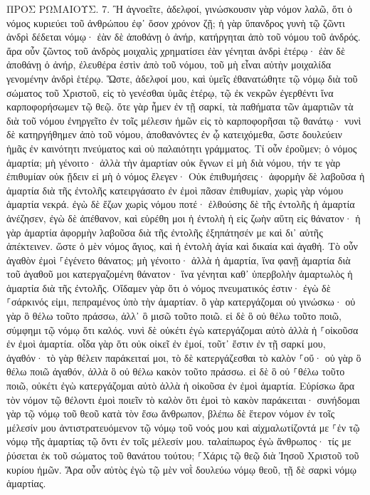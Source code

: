 \documentclass[twoside, 9pt]{extreport}
\begin{document}
ΠΡΟΣ ΡΩΜΑΙΟΥΣ.
7.
Ἢ ἀγνοεῖτε, ἀδελφοί, γινώσκουσιν γὰρ νόμον λαλῶ, ὅτι ὁ νόμος κυριεύει τοῦ ἀνθρώπου ἐφ᾽ ὅσον χρόνον ζῇ; 
ἡ γὰρ ὕπανδρος γυνὴ τῷ ζῶντι ἀνδρὶ δέδεται νόμῳ· ἐὰν δὲ ἀποθάνῃ ὁ ἀνήρ, κατήργηται ἀπὸ τοῦ νόμου τοῦ ἀνδρός. 
ἄρα οὖν ζῶντος τοῦ ἀνδρὸς μοιχαλὶς χρηματίσει ἐὰν γένηται ἀνδρὶ ἑτέρῳ· ἐὰν δὲ ἀποθάνῃ ὁ ἀνήρ, ἐλευθέρα ἐστὶν ἀπὸ τοῦ νόμου, τοῦ μὴ εἶναι αὐτὴν μοιχαλίδα γενομένην ἀνδρὶ ἑτέρῳ. 
Ὥστε, ἀδελφοί μου, καὶ ὑμεῖς ἐθανατώθητε τῷ νόμῳ διὰ τοῦ σώματος τοῦ Χριστοῦ, εἰς τὸ γενέσθαι ὑμᾶς ἑτέρῳ, τῷ ἐκ νεκρῶν ἐγερθέντι ἵνα καρποφορήσωμεν τῷ θεῷ. 
ὅτε γὰρ ἦμεν ἐν τῇ σαρκί, τὰ παθήματα τῶν ἁμαρτιῶν τὰ διὰ τοῦ νόμου ἐνηργεῖτο ἐν τοῖς μέλεσιν ἡμῶν εἰς τὸ καρποφορῆσαι τῷ θανάτῳ· 
νυνὶ δὲ κατηργήθημεν ἀπὸ τοῦ νόμου, ἀποθανόντες ἐν ᾧ κατειχόμεθα, ὥστε δουλεύειν ἡμᾶς ἐν καινότητι πνεύματος καὶ οὐ παλαιότητι γράμματος. 
Τί οὖν ἐροῦμεν; ὁ νόμος ἁμαρτία; μὴ γένοιτο· ἀλλὰ τὴν ἁμαρτίαν οὐκ ἔγνων εἰ μὴ διὰ νόμου, τήν τε γὰρ ἐπιθυμίαν οὐκ ᾔδειν εἰ μὴ ὁ νόμος ἔλεγεν· Οὐκ ἐπιθυμήσεις· 
ἀφορμὴν δὲ λαβοῦσα ἡ ἁμαρτία διὰ τῆς ἐντολῆς κατειργάσατο ἐν ἐμοὶ πᾶσαν ἐπιθυμίαν, χωρὶς γὰρ νόμου ἁμαρτία νεκρά. 
ἐγὼ δὲ ἔζων χωρὶς νόμου ποτέ· ἐλθούσης δὲ τῆς ἐντολῆς ἡ ἁμαρτία ἀνέζησεν, 
ἐγὼ δὲ ἀπέθανον, καὶ εὑρέθη μοι ἡ ἐντολὴ ἡ εἰς ζωὴν αὕτη εἰς θάνατον· 
ἡ γὰρ ἁμαρτία ἀφορμὴν λαβοῦσα διὰ τῆς ἐντολῆς ἐξηπάτησέν με καὶ δι᾽ αὐτῆς ἀπέκτεινεν. 
ὥστε ὁ μὲν νόμος ἅγιος, καὶ ἡ ἐντολὴ ἁγία καὶ δικαία καὶ ἀγαθή. 
Τὸ οὖν ἀγαθὸν ἐμοὶ ⸀ἐγένετο θάνατος; μὴ γένοιτο· ἀλλὰ ἡ ἁμαρτία, ἵνα φανῇ ἁμαρτία διὰ τοῦ ἀγαθοῦ μοι κατεργαζομένη θάνατον· ἵνα γένηται καθ᾽ ὑπερβολὴν ἁμαρτωλὸς ἡ ἁμαρτία διὰ τῆς ἐντολῆς. 
Οἴδαμεν γὰρ ὅτι ὁ νόμος πνευματικός ἐστιν· ἐγὼ δὲ ⸀σάρκινός εἰμι, πεπραμένος ὑπὸ τὴν ἁμαρτίαν. 
ὃ γὰρ κατεργάζομαι οὐ γινώσκω· οὐ γὰρ ὃ θέλω τοῦτο πράσσω, ἀλλ᾽ ὃ μισῶ τοῦτο ποιῶ. 
εἰ δὲ ὃ οὐ θέλω τοῦτο ποιῶ, σύμφημι τῷ νόμῳ ὅτι καλός. 
νυνὶ δὲ οὐκέτι ἐγὼ κατεργάζομαι αὐτὸ ἀλλὰ ἡ ⸀οἰκοῦσα ἐν ἐμοὶ ἁμαρτία. 
οἶδα γὰρ ὅτι οὐκ οἰκεῖ ἐν ἐμοί, τοῦτ᾽ ἔστιν ἐν τῇ σαρκί μου, ἀγαθόν· τὸ γὰρ θέλειν παράκειταί μοι, τὸ δὲ κατεργάζεσθαι τὸ καλὸν ⸀οὔ· 
οὐ γὰρ ὃ θέλω ποιῶ ἀγαθόν, ἀλλὰ ὃ οὐ θέλω κακὸν τοῦτο πράσσω. 
εἰ δὲ ὃ οὐ ⸀θέλω τοῦτο ποιῶ, οὐκέτι ἐγὼ κατεργάζομαι αὐτὸ ἀλλὰ ἡ οἰκοῦσα ἐν ἐμοὶ ἁμαρτία. 
Εὑρίσκω ἄρα τὸν νόμον τῷ θέλοντι ἐμοὶ ποιεῖν τὸ καλὸν ὅτι ἐμοὶ τὸ κακὸν παράκειται· 
συνήδομαι γὰρ τῷ νόμῳ τοῦ θεοῦ κατὰ τὸν ἔσω ἄνθρωπον, 
βλέπω δὲ ἕτερον νόμον ἐν τοῖς μέλεσίν μου ἀντιστρατευόμενον τῷ νόμῳ τοῦ νοός μου καὶ αἰχμαλωτίζοντά με ⸀ἐν τῷ νόμῳ τῆς ἁμαρτίας τῷ ὄντι ἐν τοῖς μέλεσίν μου. 
ταλαίπωρος ἐγὼ ἄνθρωπος· τίς με ῥύσεται ἐκ τοῦ σώματος τοῦ θανάτου τούτου; 
⸀Χάρις τῷ θεῷ διὰ Ἰησοῦ Χριστοῦ τοῦ κυρίου ἡμῶν. Ἄρα οὖν αὐτὸς ἐγὼ τῷ μὲν νοῒ δουλεύω νόμῳ θεοῦ, τῇ δὲ σαρκὶ νόμῳ ἁμαρτίας. 
\end{document}
